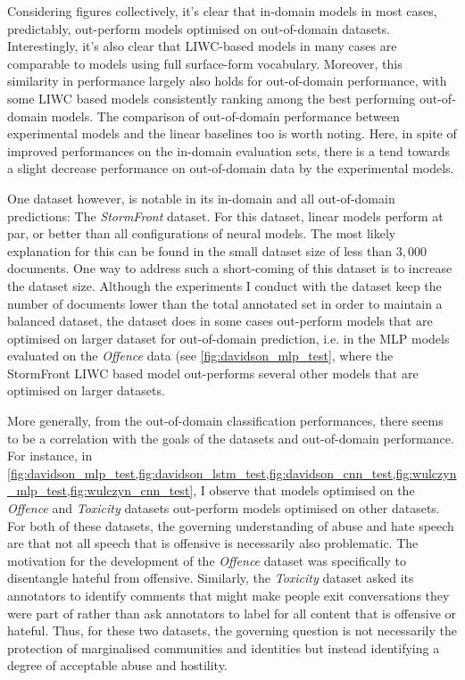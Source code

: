 Considering figures collectively, it's clear that in-domain models in most cases, predictably, out-perform models optimised on out-of-domain datasets.
Interestingly, it's also clear that LIWC-based models in many cases are comparable to models using full surface-form vocabulary.
Moreover, this similarity in performance largely also holds for out-of-domain performance, with some LIWC based models consistently ranking among the best performing out-of-domain models.
The comparison of out-of-domain performance between experimental models and the linear baselines too is worth noting.
Here, in spite of improved performances on the in-domain evaluation sets, there is a tend towards a slight decrease performance on out-of-domain data by the experimental models.

One dataset however, is notable in its in-domain and all out-of-domain predictions: The \textit{StormFront} dataset. 
For this dataset, linear models perform at par, or better than all configurations of neural models.
The most likely explanation for this can be found in the small dataset size of less than $3,000$ documents.
One way to address such a short-coming of this dataset is to increase the dataset size. 
Although the experiments I conduct with the dataset keep the number of documents lower than the total annotated set in order to maintain a balanced dataset, the dataset does in some cases out-perform models that are optimised on larger dataset for out-of-domain prediction, i.e. in the MLP models evaluated on the \textit{Offence} data (see \cref{fig:davidson_mlp_test}, where the StormFront LIWC based model  out-performs several other models that are optimised on larger datasets.

More generally, from the out-of-domain classification performances, there seems to be a correlation with the goals of the datasets and out-of-domain performance.
For instance, in \cref{fig:davidson_mlp_test,fig:davidson_lstm_test,fig:davidson_cnn_test,fig:wulczyn_mlp_test,fig:wulczyn_cnn_test}, I observe that models optimised on the \textit{Offence} and \textit{Toxicity} datasets out-perform models optimised on other datasets.
For both of these datasets, the governing understanding of abuse and hate speech are that not all speech that is offensive is necessarily also problematic.
The motivation for the development of the \textit{Offence} dataset was specifically to disentangle hateful from offensive.
Similarly, the \textit{Toxicity} dataset asked its annotators to identify comments that might make people exit conversations they were part of rather than ask annotators to label for all content that is offensive or hateful.
Thus, for these two datasets, the governing question is not necessarily the protection of marginalised communities and identities but instead identifying a degree of acceptable abuse and hostility.

